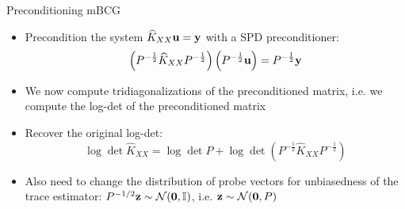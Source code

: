 \documentclass{beamer}
\begin{document}
\begin{frame}{Preconditioning mBCG}
\begin{itemize}[<+->]
    \item Precondition the system $\widehat K_{XX} \boldsymbol{\mathbf{u}} = \boldsymbol{\mathbf{y}}$ with a SPD preconditioner:
    \begin{equation*}
        \left( P^{-\frac 1 2} \widehat K_{XX} P^{-\frac 1 2} \right) \left( P^{-\frac 1 2} \boldsymbol{\mathbf{u}}\right) = P^{-\frac 1 2} \boldsymbol{\mathbf{y}}
    \end{equation*}
    \item We now compute tridiagonalizations of the preconditioned matrix, i.e. we compute the log-det of the preconditioned matrix
    \item Recover the original log-det:
    \begin{equation*}
        \log\det \widehat K_{XX} = \log \det P + \log \det \left(P^{-\frac 1 2} \widehat K_{XX} P^{-\frac 1 2} \right)
    \end{equation*}
    \item Also need to change the distribution of probe vectors for unbiasedness of the trace estimator: $P^{-1/2} \vect z \sim \mathcal N(\vect 0, \Id)$, i.e. $\boldsymbol{\mathbf{z}} \sim \mathcal N(\boldsymbol{\mathbf{0}}, P)$
\end{itemize}
\end{frame}
\end{document}
